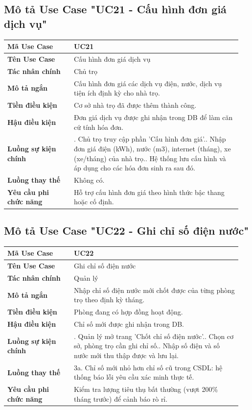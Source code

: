\subsection{Mô tả Use Case "UC21 - Cấu hình đơn giá dịch vụ"}

\begin{longtable}[]{@{}>{\RaggedRight\arraybackslash}p{0.27\linewidth}>{\RaggedRight\arraybackslash}p{0.68\linewidth}@{}}
\toprule
\textbf{Mã Use Case} & UC21\tabularnewline
\midrule
\endhead
\textbf{Tên Use Case} & Cấu hình đơn giá dịch vụ\tabularnewline
\textbf{Tác nhân chính} & Chủ trọ\tabularnewline
\textbf{Mô tả ngắn} & Cấu hình đơn giá các dịch vụ điện, nước, dịch vụ
tiện ích định kỳ cho nhà trọ.\tabularnewline
\textbf{Tiền điều kiện} & Cơ sở nhà trọ đã được thêm thành
công.\tabularnewline
\textbf{Hậu điều kiện} & Đơn giá dịch vụ được ghi nhận trong DB để làm
căn cứ tính hóa đơn.\tabularnewline
\textbf{Luồng sự kiện chính} & 1. Chủ trọ truy cập
phần 'Cấu hình đơn giá'.\newline 2. Nhập đơn giá điện (kWh), nước
(m3), internet (tháng), xe (xe/tháng) của nhà trọ.\newline 3. Hệ
thống lưu cấu hình và áp dụng cho các hóa đơn sinh ra sau
đó.\tabularnewline
\textbf{Luồng thay thế} & Không có.\tabularnewline
\textbf{Yêu cầu phi chức năng} & Hỗ trợ cấu hình đơn giá theo hình thức
bậc thang hoặc cố định.\tabularnewline
\bottomrule
\end{longtable}

\subsection{Mô tả Use Case "UC22 - Ghi chỉ số điện nước"}

\begin{longtable}[]{@{}>{\RaggedRight\arraybackslash}p{0.27\linewidth}>{\RaggedRight\arraybackslash}p{0.68\linewidth}@{}}
\toprule
\textbf{Mã Use Case} & UC22\tabularnewline
\midrule
\endhead
\textbf{Tên Use Case} & Ghi chỉ số điện nước\tabularnewline
\textbf{Tác nhân chính} & Quản lý\tabularnewline
\textbf{Mô tả ngắn} & Nhập chỉ số điện nước mới chốt được của từng phòng
trọ theo định kỳ tháng.\tabularnewline
\textbf{Tiền điều kiện} & Phòng đang có hợp đồng hoạt
động.\tabularnewline
\textbf{Hậu điều kiện} & Chỉ số mới được ghi nhận trong
DB.\tabularnewline
\textbf{Luồng sự kiện chính} & 1. Quản lý mở trang
'Chốt chỉ số điện nước'.\newline 2. Chọn cơ sở, phòng trọ cần ghi
chỉ số.\newline 3. Nhập số điện và số nước mới thu thập được và lưu
lại.\tabularnewline
\textbf{Luồng thay thế} & 3a. Chỉ số mới nhỏ hơn chỉ số cũ trong CSDL:
hệ thống báo lỗi yêu cầu xác minh thực tế.\tabularnewline
\textbf{Yêu cầu phi chức năng} & Kiểm tra lượng tiêu thụ bất thường
(vượt 200\% tháng trước) để cảnh báo rò rỉ.\tabularnewline
\bottomrule
\end{longtable}


